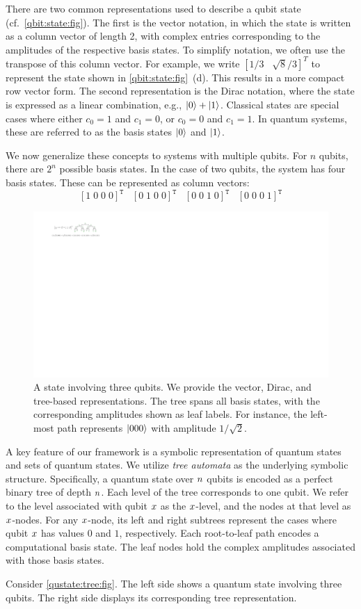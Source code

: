 There are two common representations used to describe a qubit state (cf.\ \cref{qbit:state:fig}).
%
The first is the vector notation, in which the state is written as a column vector of length 2, with complex entries corresponding to the amplitudes of the respective basis states.
%
To simplify notation, we often use the transpose of this column vector.
%
For example, we write $[1/3\;\;\;\sqrt{8}/3]^T$ to represent the state shown in \cref{qbit:state:fig}~(d).
%
This results in a more compact row vector form.
%
The second representation is the Dirac notation, where the state is expressed as a linear combination, e.g., $|0\rangle + |1\rangle$.
%
Classical states are special cases where either $c_0 = 1$ and $c_1 = 0$, or $c_0 = 0$ and $c_1 = 1$.
%
In quantum systems, these are referred to as the basis states $|0\rangle$ and $|1\rangle$.

We now generalize these concepts to systems with multiple qubits.
%
For $n$ qubits, there are $2^n$ possible basis states.
%
%
In the case of two qubits, the system has four basis states.
%
These can be represented as column vectors:
\[
\left[
1\;0\;0\;0
\right]^{\mathtt T}
\;\;\;
\left[
0\;1\;0\;0
\right]^{\mathtt T}
\;\;\;
\left[
0\;0\;1\;0
\right]^{\mathtt T}
\;\;\;
\left[
0\;0\;0\;1
\right]^{\mathtt T}
\]

\begin{figure}
\includegraphics[scale=1]{Figures/States/state3}
\caption{A state involving three qubits.  We provide the vector, Dirac, and tree-based representations.
%
The tree spans all basis states, with the corresponding amplitudes shown as leaf labels.
%
For instance, the left-most path represents $|000\rangle$ with amplitude $1/\sqrt{2}$.
}
\label{triple:qbit:state:fig}
\end{figure}


A key feature of our framework is a symbolic representation of quantum states and sets of quantum states.
%
We utilize {\it tree automata} as the underlying symbolic structure.
%
Specifically, a quantum state over $n$ qubits is encoded as a perfect binary tree of depth $n$.
%
Each level of the tree corresponds to one qubit.
%
We refer to the level associated with qubit $x$ as the $x$-level, and the nodes at that level as $x$-nodes.
%
For any $x$-node, its left and right subtrees represent the cases where qubit $x$ has values $0$ and $1$, respectively.
%
Each root-to-leaf path encodes a computational basis state.
%
The leaf nodes hold the complex amplitudes associated with those basis states.

Consider \cref{qustate:tree:fig}.
%
The left side shows a quantum state involving three qubits.
%
The right side displays its corresponding tree representation.
%
